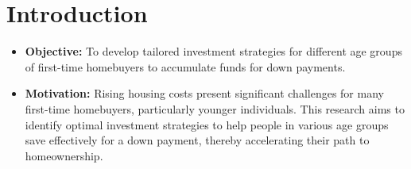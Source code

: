 \section{Introduction}
\begin{itemize}
    \item \textbf{Objective:} To develop tailored investment strategies for different age groups of first-time homebuyers to accumulate funds for down payments.
    \item \textbf{Motivation:} Rising housing costs present significant challenges for many first-time homebuyers, particularly younger individuals. This research aims to identify optimal investment strategies to help people in various age groups save effectively for a down payment, thereby accelerating their path to homeownership.
\end{itemize}
